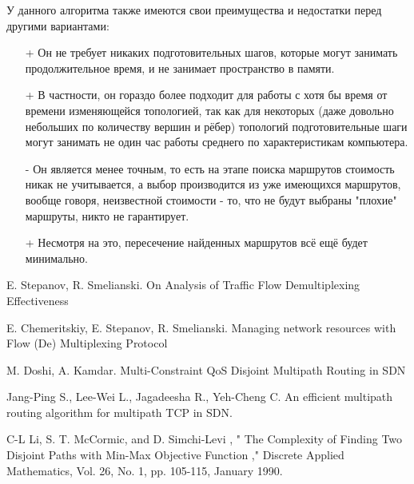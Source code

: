 \documentclass[a4paper]{article}
\begin{document}
У данного алгоритма также имеются свои преимущества и недостатки перед другими вариантами:
\begin{itemize}
\item[+] Он не требует никаких подготовительных шагов, которые могут занимать продолжительное время, и не занимает пространство в памяти.
\item[+] В частности, он гораздо более подходит для работы с хотя бы время от времени изменяющейся топологией, так как для некоторых (даже довольно небольших по количеству вершин и рёбер) топологий подготовительные шаги могут занимать не один час работы среднего по характеристикам компьютера.
\item[-] Он является менее точным, то есть на этапе поиска маршрутов стоимость никак не учитывается, а выбор производится из уже имеющихся маршрутов, вообще говоря, неизвестной стоимости - то, что не будут выбраны "плохие" маршруты, никто не гарантирует.
\item[+] Несмотря на это, пересечение найденных маршрутов всё ещё будет минимально. 
\end{itemize}





\newpage
\begin{thebibliography}{5}
E. Stepanov, R. Smelianski. On Analysis of Traffic Flow Demultiplexing Effectiveness

E. Chemeritskiy, E. Stepanov, R. Smelianski. Managing network resources with Flow (De) Multiplexing Protocol

M. Doshi, A. Kamdar. Multi-Constraint QoS Disjoint Multipath Routing in SDN

Jang-Ping S., Lee-Wei L., Jagadeesha R., Yeh-Cheng C. An efficient multipath routing algorithm for multipath TCP in SDN.

C-L Li, S. T. McCormic, and D. Simchi-Levi , " The Complexity of
Finding Two Disjoint Paths with Min-Max Objective Function ,"
Discrete Applied Mathematics, Vol. 26, No. 1, pp. 105-115, January
1990.
\end{thebibliography}
\end{document}
